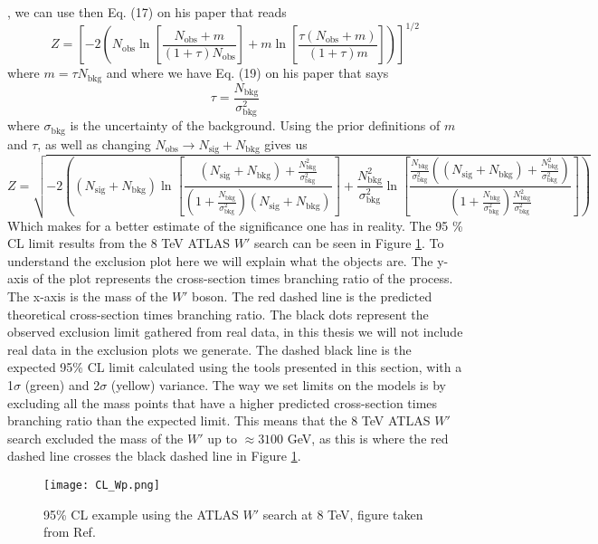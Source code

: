 \documentclass[12pt, a4paper]{book}
\begin{document}
\cite{Cowan_Uncertainty_in_sig}, we can use then Eq. (17) on his paper that reads
$$
Z = \left[-2\left(N_{\text{obs}}\ln\left[\frac{N_{\text{obs}}+m}{(1+\tau)N_{\text{obs}}}\right] + m\ln\left[\frac{\tau(N_{\text{obs}}+m)}{(1+\tau)m}\right]\right)\right]^{1/2}
$$
where $m=\tau N_{\text{bkg}}$ and where we have Eq. (19) on his paper that says
$$
\tau=\frac{N_{\text{bkg}}}{\sigma_{\text{bkg}}^2}
$$
where $\sigma_{\text{bkg}}$ is the uncertainty of the background. Using the prior definitions of $m$ and $\tau$, as well as changing $N_{\text{obs}} \rightarrow N_{\text{sig}}+N_{\text{bkg}}$ gives us
\begin{equation}\label{eq:significance}
    \textstyle    Z = \sqrt{-2\left((N_{\text{sig}}+N_{\text{bkg}})\ln\left[\frac{(N_{\text{sig}}+N_{\text{bkg}})+\frac{N_{\text{bkg}}^2}{\sigma_{\text{bkg}}^2} }{(1+\frac{N_{\text{bkg}}}{\sigma_{\text{bkg}}^2})(N_{\text{sig}}+N_{\text{bkg}})}\right] + \frac{N_{\text{bkg}}^2}{\sigma_{\text{bkg}}^2} \ln\left[\frac{\frac{N_{\text{bkg}}}{\sigma_{\text{bkg}}^2}((N_{\text{sig}}+N_{\text{bkg}})+\frac{N_{\text{bkg}}^2}{\sigma_{\text{bkg}}^2} )}{(1+\frac{N_{\text{bkg}}}{\sigma_{\text{bkg}}^2})\frac{N_{\text{bkg}}^2}{\sigma_{\text{bkg}}^2}}\right]\right)}
\end{equation}
Which makes for a better estimate of the significance one has in reality.
\newpage\noindent The 95 \% CL limit results from the 8 TeV ATLAS $W'$ search \cite{Stat} can be seen in Figure \ref{fig:HIGGS_CL}. To understand the exclusion plot here we will explain what the objects are. The y-axis of the plot represents the cross-section times branching ratio of the process. 
The x-axis is the mass of the $W'$ boson. The red dashed line is the predicted theoretical cross-section times branching ratio. The black dots represent the observed exclusion limit gathered from real data, in this thesis we will not include real data in the exclusion plots we generate. 
The dashed black line is the expected 95\% CL limit calculated using the tools presented in this section, with a 1$\sigma$ (green) and 2$\sigma$ (yellow) variance. The way we set limits on the models is by excluding all the mass points that have a higher predicted cross-section times branching ratio than the expected limit. 
This means that the 8 TeV ATLAS $W'$ search excluded the mass of the $W'$ up to $\approx3100$ GeV, as this is where the red dashed line crosses the black dashed line in Figure \ref{fig:HIGGS_CL}.
\begin{figure}[!ht]
	\centering
    \texttt{[image: CL\_Wp.png]}
    \caption[95\% CL example using the ATLAS $W'$ search at 8 TeV]{95\% CL example using the ATLAS $W'$ search at 8 TeV, figure taken from Ref. \cite{Stat}}\label{fig:HIGGS_CL}
\end{figure}
\end{document}
